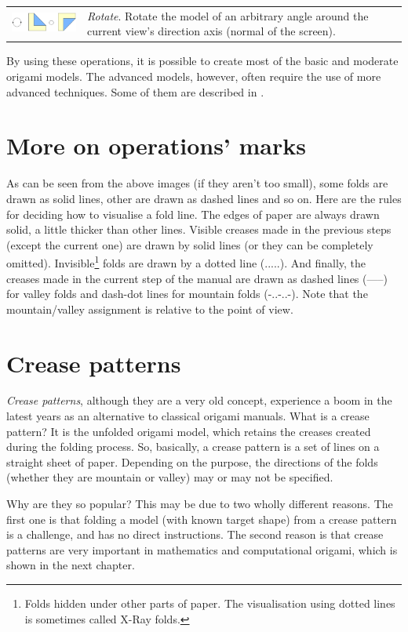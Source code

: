 \begin{savenotes}
\begin{longtable}{lp{9cm}}
\includegraphics[width=4cm]{images/folds_rotate} & \emph{Rotate}. Rotate the model of an arbitrary angle around the current view's direction axis (normal of the screen).\\
\end{longtable}
\end{savenotes}

By using these operations, it is possible to create most of the basic and moderate origami models. The advanced models, however, often require the use of more advanced techniques. Some of them are described in \cite{lang}.

\section{More on operations' marks}
\label{sec:operationMarks}
As can be seen from the above images (if they aren't too small), some folds are drawn as solid lines, other are drawn as dashed lines and so on. Here are the rules for deciding how to visualise a fold line. The edges of paper are always drawn solid, a little thicker than other lines. Visible creases made in the previous steps (except the current one) are drawn by solid lines (or they can be completely omitted). Invisible\footnote{Folds hidden under other parts of paper. The visualisation using dotted lines is sometimes called X-Ray folds.} folds are drawn by a dotted line (.....). And finally, the creases made in the current step of the manual are drawn as dashed lines (-----) for valley folds and dash-dot lines for mountain folds (-..-..-). Note that the mountain/valley assignment is relative to the point of view.

\section{Crease patterns}
\label{sec:creasePatterns}
\emph{Crease patterns}, although they are a very old concept, experience a boom in the latest years as an alternative to classical origami manuals. What is a crease pattern? It is the unfolded origami model, which retains the creases created during the folding process. So, basically, a crease pattern is a set of lines on a straight sheet of paper. Depending on the purpose, the directions of the folds (whether they are mountain or valley) may or may not be specified.

Why are they so popular? This may be due to two wholly different reasons. The first one is that folding a model (with known target shape) from a crease pattern is a challenge, and has no direct instructions. The second reason is that crease patterns are very important in mathematics and computational origami, which is shown in the next chapter.
